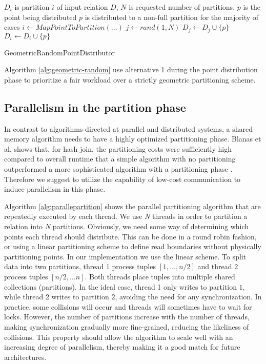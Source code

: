 \documentclass[12pt,a4paper,twoside]{report}
\begin{document}
\begin{algorithm}[H]
	\begin{algorithmic}
		\Require	$D_i$ is partition $i$ of input relation $D$,
					$N$	is requested number of partitions,
					$p$ is the point being distributed
		\Ensure $p$ is distributed to a non-full partition for the
		majority of cases
   		\State $i \leftarrow MapPointToPartition(\ldots)$
   			\State $j \leftarrow rand(1,N)$
   			\State $D_j \leftarrow D_j \cup \{p\}$
   		\Else
   			\State $D_i \leftarrow D_i \cup \{p\}$
   		\EndIf
   \end{algorithmic}
	\caption{GeometricRandomPointDistributor}
	\label{alg:geometric-random}
\end{algorithm}

Algorithm \ref{alg:geometric-random} use alternative 1 during the
point distribution phase to prioritize a fair workload over a strictly
geometric partitioning scheme.

\subsection{Parallelism in the partition phase}
\label{sec:parallelism-in-the-partition-phase}

In contrast to algorithms directed at parallel and distributed
systems, a shared-memory algorithm needs to have a highly optimized
partitioning phase. Blanas et al. shows that, for hash join, the
partitioning costs were sufficiently high compared to overall runtime
that a simple algorithm with no partitioning outperformed a more
sophisticated algorithm with a partitioning phase
\cite{blanas2011design}. Therefore we suggest to utilize the
capability of low-cost communication to induce parallelism in this
phase.

Algorithm \ref{alg:parallepartition} shows the parallel partitioning
algorithm that are repeatedly executed by each thread. We use
\textit{N} threads in order to partition a relation into \textit{N}
partitions. Obviously, we need some way of determining which points
each thread should distribute. This can be done in a round robin
fashion, or using a linear partitioning scheme to define read
boundaries without physically partitioning points. In our
implementation we use the linear scheme. To split data into two
partitions, thread 1 process tuples $[1, \ldots, n/2]$ and thread 2
process tuples $[n/2, \ldots n]$. Both threads place tuples into
multiple shared collections (partitions). In the ideal case, thread 1
only writes to partition $1$, while thread 2 writes to partition $2$,
avoiding the need for any synchronization.  In practice, some
collisions will occur and threads will sometimes have to wait for
locks. However, the number of partitions increase with
the number of threads, making synchronization gradually more
fine-grained, reducing the likeliness of collisions. This property
should allow the algorithm to scale well with an increasing degree of
parallelism, thereby making it a good match for future architectures.
\end{document}
